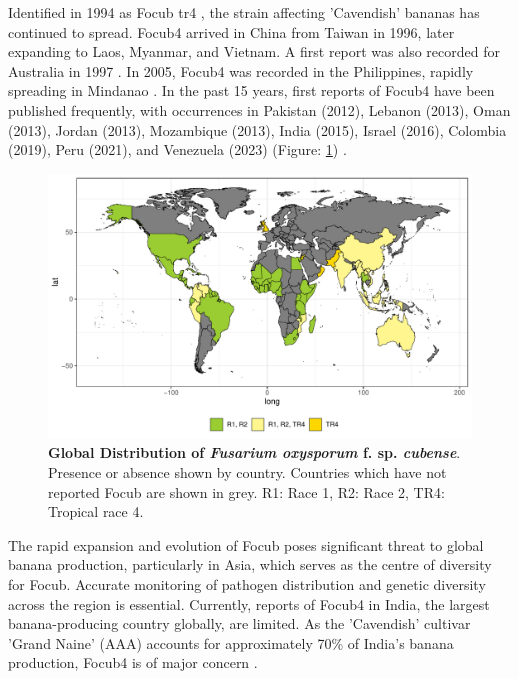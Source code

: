 Identified in 1994 as \ac{Focub} \ac{tr4} \parencite{Ploetz1994}, the strain affecting 'Cavendish' bananas has continued to spread. \Ac{Focub4} arrived in China from Taiwan in 1996, later expanding to Laos, Myanmar, and Vietnam. A first report was also recorded for Australia in 1997 \parencite{Ploetz2015a}. In 2005, \ac{Focub4} was recorded in the Philippines, rapidly spreading in Mindanao \parencite{Molina2009}. In the past 15 years, first reports of \ac{Focub4} have been published frequently, with occurrences in Pakistan (2012), Lebanon (2013), Oman (2013), Jordan (2013), Mozambique (2013), India (2015), Israel (2016), Colombia (2019), Peru (2021), and Venezuela (2023) (Figure: \ref{fig:FocDis}) \parencite{Butler2013, Ploetz2015a, Ordonez2015, Zheng2018, Thangavelu2019, Garcia-Bastida2020, Maymon2020, Kema2021, Acuna2022,  Herrera2023}.

\bigskip
\begin{figure}[h!]
  \includegraphics[width=14.5cm]{Figures/FocDis.pdf}
  \caption[Global Distribution of \textit{Fusarium oxysporum} f. sp. \textit{cubense}]{\textbf{Global Distribution of \textit{Fusarium oxysporum} f. sp. \textit{cubense}}. Presence or absence shown by country. Countries which have not reported \ac{Focub} are shown in grey. R1: Race 1, R2: Race 2, TR4: Tropical race 4.}
  \label{fig:FocDis}
\end{figure}

The rapid expansion and evolution of \ac{Focub} poses significant threat to global banana production, particularly in Asia, which serves as the centre of diversity for \ac{Focub}. Accurate monitoring of pathogen distribution and genetic diversity across the region is essential.  Currently, reports of \ac{Focub4} in India, the largest banana-producing country globally, are limited. As the 'Cavendish' cultivar 'Grand Naine' (AAA) accounts for approximately 70\% of India's banana production, \ac{Focub4} is of major concern \parencite{Damodaran2019}. 

